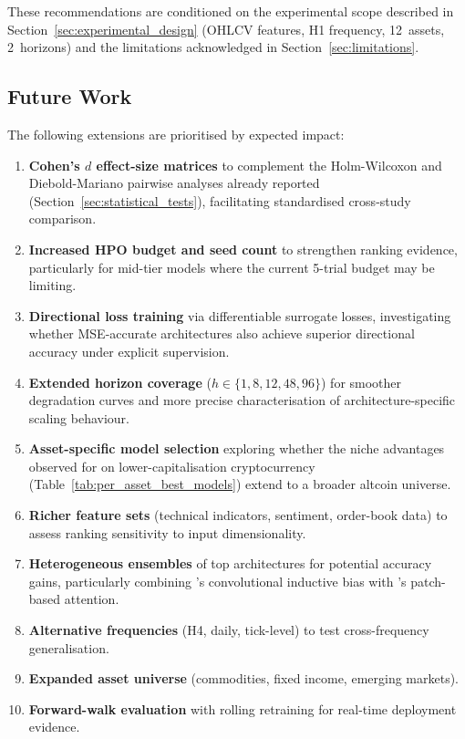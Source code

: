These recommendations are conditioned on the experimental scope described in Section~\ref{sec:experimental_design} (OHLCV features, H1 frequency, 12~assets, 2~horizons) and the limitations acknowledged in Section~\ref{sec:limitations}.

\subsection{Future Work}
\label{sec:future_work}

The following extensions are prioritised by expected impact:

\begin{enumerate}

  \item \textbf{Cohen's $d$ effect-size matrices} to complement the Holm-Wilcoxon and Diebold-Mariano pairwise analyses already reported (Section~\ref{sec:statistical_tests}), facilitating standardised cross-study comparison.

  \item \textbf{Increased HPO budget and seed count} to strengthen ranking evidence, particularly for mid-tier models where the current 5-trial budget may be limiting.

  \item \textbf{Directional loss training} via differentiable surrogate losses, investigating whether MSE-accurate architectures also achieve superior directional accuracy under explicit supervision.

  \item \textbf{Extended horizon coverage} ($h \in \{1, 8, 12, 48, 96\}$) for smoother degradation curves and more precise characterisation of architecture-specific scaling behaviour.

  \item \textbf{Asset-specific model selection} exploring whether the niche advantages observed for \nhits on lower-capitalisation cryptocurrency (Table~\ref{tab:per_asset_best_models}) extend to a broader altcoin universe.

  \item \textbf{Richer feature sets} (technical indicators, sentiment, order-book data) to assess ranking sensitivity to input dimensionality.

  \item \textbf{Heterogeneous ensembles} of top architectures for potential accuracy gains, particularly combining \moderntcn's convolutional inductive bias with \patchtst's patch-based attention.

  \item \textbf{Alternative frequencies} (H4, daily, tick-level) to test cross-frequency generalisation.

  \item \textbf{Expanded asset universe} (commodities, fixed income, emerging markets).

  \item \textbf{Forward-walk evaluation} with rolling retraining for real-time deployment evidence.
\end{enumerate}
